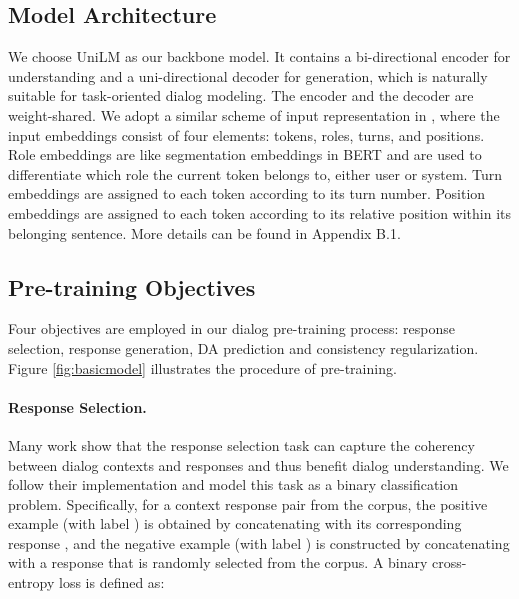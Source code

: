 \documentclass[letterpaper]{article} \usepackage{aaai22}  \usepackage{times}  \usepackage{helvet}  \usepackage{courier}  \usepackage[hyphens]{url}  \usepackage{graphicx} \urlstyle{rm} \def\UrlFont{\rm}  \usepackage{natbib}  \usepackage{caption} \DeclareCaptionStyle{ruled}{labelfont=normalfont,labelsep=colon,strut=off} \frenchspacing  \setlength{\pdfpagewidth}{8.5in}  \setlength{\pdfpageheight}{11in}  \usepackage{algorithm}
\begin{document}
\subsection{Model Architecture}
We choose UniLM \cite{dong2019unified} as our backbone model.
It contains a bi-directional encoder for understanding and a uni-directional decoder for generation, which is  naturally suitable for task-oriented dialog modeling. The encoder and the decoder are weight-shared.
We adopt a similar scheme of input representation in \citet{bao2020plato}, where the input embeddings consist of four elements: tokens, roles, turns, and positions. 
Role embeddings are like segmentation embeddings in BERT and are used to differentiate which role the current token belongs to, either user or system. Turn embeddings are assigned to each token according to its turn number. Position embeddings are assigned to each token according to its relative position within its belonging sentence. More details can be found in Appendix B.1.

















\subsection{Pre-training Objectives}
Four objectives are employed in our dialog pre-training process:
response selection, response generation,  DA prediction and consistency regularization. Figure \ref{fig:basicmodel} illustrates the procedure of pre-training. 


\paragraph{Response Selection.} Many work \cite{wu2020tod, bao2020plato, henderson2019convert} show that the response selection task can capture the coherency between dialog contexts and responses and thus benefit dialog understanding. 
We follow their implementation and model this task as a binary classification problem. 
Specifically, for a context response pair  from the corpus,
the positive example (with label ) is obtained by concatenating  with its corresponding response ,
and the negative example (with label ) is constructed by concatenating  with a response  that is randomly selected from the corpus.
A binary cross-entropy loss is defined as:
\end{document}
